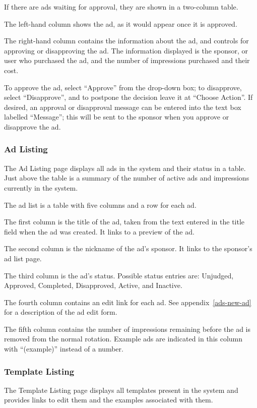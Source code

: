 If there are ads waiting for approval, they are shown in a two-column table.

The left-hand column shows the ad, as it would appear once it is approved.

The right-hand column contains the information about the ad, and controls for approving or disapproving the ad.  The information displayed is the sponsor, or user who purchased the ad, and the number of impressions purchased and their cost.

To approve the ad, select ``Approve'' from the drop-down box; to disapprove, select ``Disapprove'', and to postpone the decision leave it at ``Choose Action''.  If desired, an approval or disapproval message can be entered into the text box labelled ``Message''; this will be sent to the sponsor when you approve or disapprove the ad.

\subsubsection{Ad Listing}

The Ad Listing page displays all ads in the system and their status in a table.  Just above the table is a summary of the number of active ads and impressions currently in the system.

The ad list is a table with five columns and a row for each ad.

The first column is the title of the ad, taken from the text entered in the title field when the ad was created.  It links to a preview of the ad.

The second column is the nickname of the ad's sponsor.  It links to the sponsor's ad list page.

The third column is the ad's status.  Possible status entries are: Unjudged, Approved, Completed, Disapproved, Active, and Inactive.

The fourth column contains an edit link for each ad.  See appendix~\ref{ads-new-ad} for a description of the ad edit form.

The fifth column contains the number of impressions remaining before the ad is removed from the normal rotation.  Example ads are indicated in this column with ``(example)'' instead of a number.

\subsubsection{Template Listing}

The Template Listing page displays all templates present in the system and provides links to edit them and the examples associated with them.

